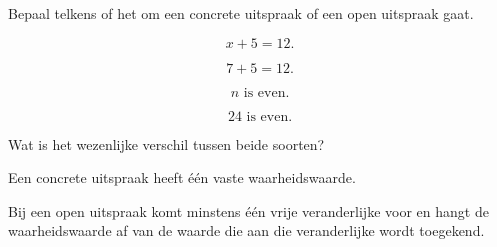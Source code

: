 \documentclass{ximera}
\begin{document}
\begin{oefening}{\oefB \ESS}

Bepaal telkens of het om een concrete uitspraak of een open uitspraak
gaat.

\begin{question}
\[
x+5=12.
\]

\begin{multipleChoice}
\end{multipleChoice}
\end{question}


\begin{question}
\[
7+5=12.
\]

\begin{multipleChoice}
\end{multipleChoice}
\end{question}


\begin{question}
\[
n\text{ is even.}
\]

\begin{multipleChoice}
\end{multipleChoice}
\end{question}


\begin{question}
\[
24\text{ is even.}
\]

\begin{multipleChoice}
\end{multipleChoice}
\end{question}


\begin{question}
Wat is het wezenlijke verschil tussen beide soorten?

\begin{oplossing}
Een concrete uitspraak heeft één vaste waarheidswaarde.

Bij een open uitspraak komt minstens één vrije veranderlijke voor en
hangt de waarheidswaarde af van de waarde die aan die veranderlijke
wordt toegekend.
\end{oplossing}
\end{question}

\end{oefening}
\end{document}
